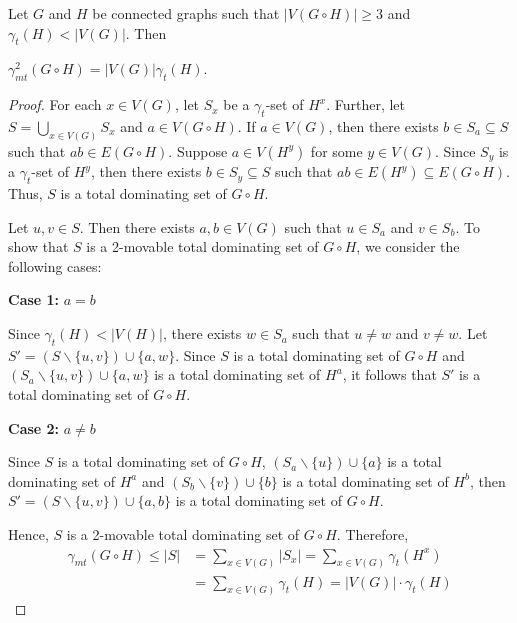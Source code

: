 \documentclass[twoside,12pt]{article}
\begin{document}
\begin{theorem}\label{Thm:16}\rm
	Let $G$ and $H$ be connected graphs such that $|V(G \circ H)| \geq 3$ and $\gamma_t (H) < |V(G)|$. Then
	\begin{center}
		$\gamma_{mt}^2 (G \circ H)=|V(G)| \gamma_t (H)$.
	\end{center}
\end{theorem}

\begin{proof}
	For each $x \in V(G)$, let $S_x$ be a $\gamma_t$-set of $H^x$. Further, let $S = \displaystyle \bigcup_{x \in V(G)} S_x$ and $a \in V(G \circ H)$. If $a \in V(G)$, then there exists $b \in S_a \subseteq S$ such that $ab \in E(G \circ H)$. Suppose $a \in V(H^y)$ for some $y \in V(G)$. Since $S_y$ is a $\gamma_t$-set of $H^y$, then there exists $b \in S_y \subseteq S$ such that $ab \in E(H^y) \subseteq E(G \circ H)$. Thus, $S$ is a total dominating set of $G \circ H$.
	
	Let $u,v \in S$. Then there exists $a,b \in V(G)$ such that $u \in S_a$ and $v \in S_b$. To show that $S$ is a 2-movable total dominating set of $G \circ H$, we consider the following cases:
	
	\noindent \textbf{Case 1:} $a =b$
	
	Since $\gamma_t(H) < |V(H)|$, there exists $w \in S_a$ such that $u \not= w$ and $v \not= w$. Let $S'=(S \backslash \{u,v\}) \cup \{a,w\}$. Since $S$ is a total dominating set of $G \circ H$ and $(S_a \backslash \{u,v\}) \cup \{a,w\}$ is a total dominating set of $H^a$, it follows that $S'$ is a total dominating set of $G \circ H$.
	
	\noindent \textbf{Case 2:} $a \not=b$
	
	Since $S$ is a total dominating set of $G \circ H$, $(S_a \backslash \{u\}) \cup \{a\}$ is a total dominating set of $H^a$ and $(S_b \backslash \{v\}) \cup \{b\}$ is a total dominating set of $H^b$, then $S' = (S \backslash \{u,v\}) \cup \{a,b\}$ is a total dominating set of $G \circ H$.
	
	Hence, $S$ is a 2-movable total dominating set of $G \circ H$. Therefore,
	\begin{align*}
		\gamma_{mt} (G \circ H) \leq |S| &= \displaystyle \sum_{x \in V(G)} |S_x|= \displaystyle \sum_{x \in V(G)} \gamma_t (H^x) \\
		&= \displaystyle \sum_{x \in V(G)} \gamma_t (H) = |V(G)| \cdot \gamma_t (H)
	\end{align*}	
	

\end{proof}
\end{document}
